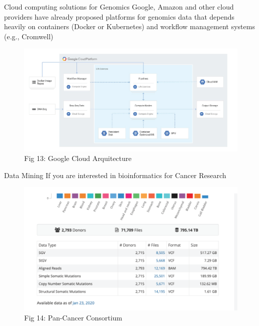 \documentclass{beamer}
\begin{document}
	\begin{frame}{Cloud computing solutions for Genomics}
		Google, Amazon and other cloud providers have already proposed platforms
		for genomics data that depends heavily on containers (Docker or
		Kubernetes) and workflow management systems (e.g., Cromwell)
		
		\begin{figure}[h]
			\centering
			\includegraphics[scale=0.45]{Figures/google.png}
			\caption{Fig 13: Google Cloud Arquitecture}
		\end{figure}
		
	\end{frame}
	\begin{frame}{Data Mining}
		If you are interested in bioinformatics for Cancer Research
		
		\begin{figure}[h]
			\centering
			\includegraphics[scale=0.45]{Figures/pancancer.png}
			\caption{Fig 14: Pan-Cancer Consortium}
		\end{figure}
		
	\end{frame}
\end{document}
